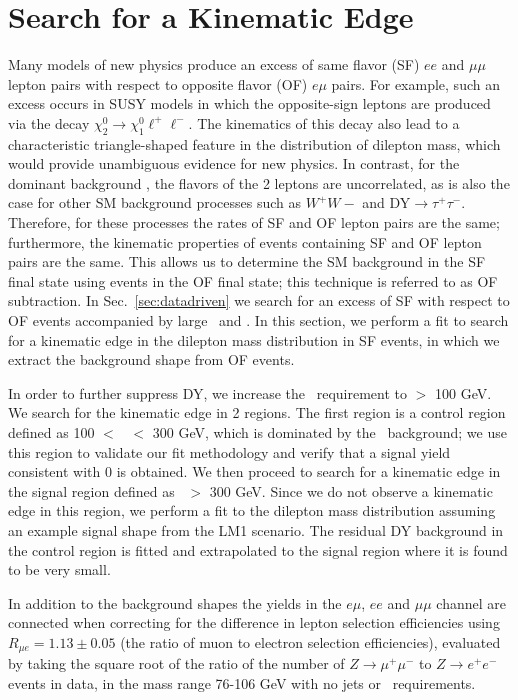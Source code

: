 \section{Search for a Kinematic Edge}
\label{sec:fit}

Many models of new physics produce an excess of same flavor (SF) $ee$ and $\mu\mu$ lepton pairs
with respect to opposite flavor (OF) $e\mu$ pairs. For example, such an excess occurs in SUSY models
in which the opposite-sign leptons are produced via the decay $\chi_2^0 \to \chi_1^0 \ell^+\ell^-$.
The kinematics of this decay also lead to a characteristic triangle-shaped feature in the distribution
of dilepton mass, which would provide unambiguous evidence for new physics.
In contrast, for the dominant background \ttbar, the flavors of the 2 leptons are uncorrelated,
as is also the case for other SM background processes such as $W^+W-$ and DY$\to\tau^+\tau^-$.
Therefore, for these processes the rates of SF and OF lepton pairs are the same; 
furthermore, the kinematic properties of events containing SF and OF lepton pairs are the same. 
This allows us to determine the SM background in the SF final state using events in the OF
final state; this technique is referred to as OF subtraction. In Sec.~\ref{sec:datadriven}
we search for an excess of SF with respect to OF events accompanied by large \MET\ and \Ht. 
In this section, we perform a fit to search for a kinematic edge in the dilepton mass distribution 
in SF events, in which we extract the background shape from OF events.

In order to further suppress DY, we increase the \MET\ requirement to \MET $>$ 100 GeV. 
We search for the kinematic edge in 2 regions.  The first region is a control region defined
as 100 $<$ \Ht\ $<$ 300 GeV, which is dominated by the \ttbar\ background; we use 
this region to validate our fit methodology and verify that a signal yield consistent with 0 
is obtained. We then proceed to search for a kinematic edge in the signal region defined as 
\Ht\ $>$ 300 GeV. Since we do not observe a kinematic edge in this region, we perform a 
fit to the dilepton mass distribution assuming an example signal shape from the LM1 scenario.
The residual DY background in the control region is fitted and extrapolated
to the signal region where it is found to be very small.

In addition to the background shapes the yields in the $e\mu$, $ee$ and $\mu\mu$
channel are connected when correcting for the difference in lepton selection efficiencies
using $R_{\mu e} = 1.13 \pm 0.05$ (the ratio of muon to electron selection efficiencies),
evaluated by taking the square root of the ratio of the number of 
$Z \to \mu^+\mu^-$ to $Z \to e^+e^-$ events in data, in the mass range 76-106 GeV with no jets or 
\met\ requirements. 
 
